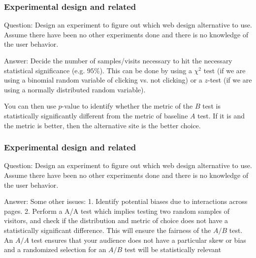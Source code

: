\documentclass[11pt]{beamer}
\begin{document}
\begin{frame}
\frametitle{Experimental design and related}
\begin{block}{Question:}
	Design an experiment to figure out which web design alternative to use. Assume there have been no other experiments done and there is no knowledge of the user behavior.
\end{block}
\begin{block}{Answer:}
	Decide the number of samples/visits necessary to hit the necessary statistical significance (e.g. $95\%$). This can be done by using a $\chi^2$ test (if we are using a binomial random variable of clicking vs. not clicking) or a $z$-­test (if we are using a normally distributed random variable). 
	
	You can then use $p$­-value to identify whether the metric of the $B$ test is statistically significantly different from the metric of  baseline $A$ test. If it is and the metric is better, then the alternative site is the better choice.
\end{block}
\end{frame}

\begin{frame}
\frametitle{Experimental design and related}
\begin{block}{Question:}
	Design an experiment to figure out which web design alternative to use. Assume there have been no other experiments done and there is no knowledge of the user behavior.
\end{block}
\begin{block}{Answer:}
	Some other issues:
	1. Identify potential biases due to interactions across pages. 
	2. Perform a A/A test which implies testing two random samples of visitors, and check if the distribution and metric of choice does not have a statistically significant difference. This will ensure the fairness of the $A/B$ test. An $A/A$ test ensures that your audience does not have a particular skew or bias and a randomized selection for an $A/B$ test will be statistically relevant
\end{block}
\end{frame}
\end{document}
